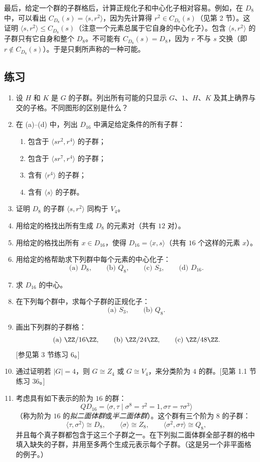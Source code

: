 最后，给定一个群的子群格后，计算正规化子和中心化子相对容易。例如，在 $D_8$ 中，可以看出 $C_{D_8}(s)=\langle s,r^2\rangle$，因为先计算得 $r^2\in C_{D_8}(s)$（见第 2 节）。这证明 $\langle s,r^2\rangle\leq C_{D_8}(s)$（注意一个元素总属于它自身的中心化子）。包含 $\langle s,r^2\rangle$ 的子群只有它自身和整个 $D_8$。不可能有 $C_{D_8}(s)=D_8$，因为 $r$ 不与 $s$ 交换（即 $r\notin C_{D_8}(s)$）。于是只剩所声称的一种可能。

\subsection*{练习}

\begin{enumerate}[label=\arabic*.]
  \item 设 $H$ 和 $K$ 是 $G$ 的子群。列出所有可能的只显示 $G$、$1$、$H$、$K$ 及其上确界与交的子格。不同图形的区别是什么？
  \item 在 (a)--(d) 中，列出 $D_{16}$ 中满足给定条件的所有子群：
  \begin{enumerate}[label=(\alph*)]
    \item 包含于 $\langle sr^2,r^4\rangle$ 的子群；
    \item 包含于 $\langle sr^7,r^4\rangle$ 的子群；
    \item 含有 $\langle r^4\rangle$ 的子群；
    \item 含有 $\langle s\rangle$ 的子群。
  \end{enumerate}
  \item 证明 $D_8$ 的子群 $\langle s,r^2\rangle$ 同构于 $V_4$。
  \item 用给定的格找出所有生成 $D_8$ 的元素对（共有 $12$ 对）。
  \item 用给定的格找出所有 $x\in D_{16}$，使得 $D_{16}=\langle x,s\rangle$（共有 $16$ 个这样的元素 $x$）。
  \item 用给定的格帮助求下列群中每个元素的中心化子：
  \[
    \text{(a) }D_8,\qquad
    \text{(b) }Q_8,\qquad
    \text{(c) }S_3,\qquad
    \text{(d) }D_{16}.
  \]
  \item 求 $D_{16}$ 的中心。
  \item 在下列每个群中，求每个子群的正规化子：
  \[
    \text{(a) }S_3,
    \qquad
    \text{(b) }Q_8.
  \]
  \item 画出下列群的子群格：
  \[
    \text{(a) }\ZZ/16\ZZ,
    \qquad
    \text{(b) }\ZZ/24\ZZ,
    \qquad
    \text{(c) }\ZZ/48\ZZ.
  \]
  [参见第 3 节练习 6。]
  \item 通过证明若 $|G|=4$，则 $G\cong Z_4$ 或 $G\cong V_4$，来分类阶为 $4$ 的群。[见第 1.1 节练习 36。]
  \item 考虑具有如下表示的阶为 $16$ 的群：
  \[
    QD_{16}=\langle \sigma,\tau\mid \sigma^8=\tau^2=1,
    \sigma\tau=\tau\sigma^3\rangle
  \]
  （称为阶为 $16$ 的\emph{拟二面体群}或\emph{半二面体群}）。这个群有三个阶为 $8$ 的子群：
  \[
    \langle \tau,\sigma^2\rangle\cong D_8,
    \qquad
    \langle\sigma\rangle\cong Z_8,
    \qquad
    \langle\sigma^2,\sigma\tau\rangle\cong Q_8,
  \]
  并且每个真子群都包含于这三个子群之一。在下列拟二面体群全部子群的格中填入缺失的子群，并用至多两个生成元表示每个子群。（这是另一个非平面格的例子。）


\end{enumerate}
